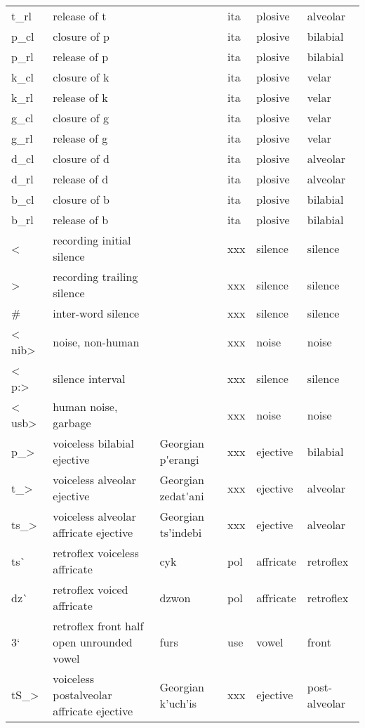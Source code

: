 {\begin{longtable}{l|p{.3\linewidth}|p{.15\linewidth}|l|p{.15\linewidth}|l}
	t\_rl	& release of t	& 	& ita	& plosive	& alveolar	\\
	p\_cl	& closure of p	& 	& ita	& plosive	& bilabial	\\
	p\_rl	& release of p	& 	& ita	& plosive	& bilabial	\\
	k\_cl	& closure of k	& 	& ita	& plosive	& velar	\\
	k\_rl	& release of k	& 	& ita	& plosive	& velar	\\
	g\_cl	& closure of g	& 	& ita	& plosive	& velar	\\
	g\_rl	& release of g	& 	& ita	& plosive	& velar	\\
	d\_cl	& closure of d	& 	& ita	& plosive	& alveolar	\\
	d\_rl	& release of d	& 	& ita	& plosive	& alveolar	\\
	b\_cl	& closure of b	& 	& ita	& plosive	& bilabial	\\
	b\_rl	& release of b	& 	& ita	& plosive	& bilabial	\\
	\textless{}	& recording initial silence	& 	& xxx	& silence	& silence	\\
	\textgreater{}	& recording trailing silence	& 	& xxx	& silence	& silence	\\
	\#	& inter-word silence	& 	& xxx	& silence	& silence	\\
	\textless{} nib\textgreater{}	& noise, non-human	& 	& xxx	& noise	& noise	\\
	\textless{} p:\textgreater{}	& silence interval	& 	& xxx	& silence	& silence	\\
	\textless{} usb\textgreater{}	& human noise, garbage	& 	& xxx	& noise	& noise	\\
	p\_\textgreater{}	& voiceless bilabial ejective	& Georgian p\'{}erangi	& xxx	& ejective	& bilabial\\	
	t\_\textgreater{}	& voiceless alveolar ejective	& Georgian zedat\'{}ani	& xxx	& ejective	& alveolar\\
	ts\_\textgreater{}	& voiceless alveolar affricate ejective	& Georgian ts'indebi	& xxx	& ejective	& alveolar	\\
	ts\`	& retroflex voiceless affricate	& cyk	& pol	& affricate	& retroflex	\\
	dz\`	& retroflex voiced affricate	& dzwon	& pol	& affricate	& retroflex	\\
	3`	& retroflex front half open unrounded vowel	& furs	& use	& vowel	& front	\\
	tS\_\textgreater{}	& voiceless postalveolar affricate ejective	& Georgian k'uch'is	& xxx	& ejective	& post-alveolar	\\

\end{longtable}}
